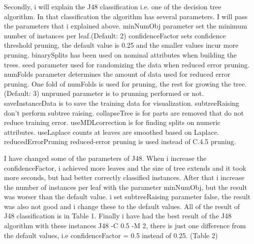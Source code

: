 \documentclass[a4paper]{article}
\begin{document}
Secondly, i will explain the J48 classification i.e. one of the decision tree algorithm. In that classification the algorithm has several parameters. I will pass the parameters that i explained above. minNumObj parameter set the minimum number of instances per leaf.(Default: 2) confidenceFactor sets confidence threshold pruning, the default value is 0.25 and the smaller values incur more pruning. binarySplits has been used on nominal attributes when building the trees. seed parameter used for randomizing the data when reduced error pruning. numFolds parameter determines the amount of data used for reduced error pruning.  One fold of numFolds is used for pruning, the rest for growing the tree. (Default: 3) unpruned parameter is to prunning performed or not. saveInstanceData is to save the training data for visualization. subtreeRaising don't perform subtree raising. collapseTree is for parts are removed that do not reduce training error. useMDLcorrection is for finding splits on numeric attributes. useLaplace counts at leaves are smoothed based on Laplace. reducedErrorPruning reduced-error pruning is used instead of C.4.5 pruning. 

I have changed some of the parameters of J48. When i increase the confidenceFactor, i achieved more leaves and the size of tree extends and it took more seconds, but had better correctly classified instances. After that i increase the number of instances per leaf with the parameter minNumObj, but the result was worser than the default value. i set subtreeRaising parameter false, the result was also not good and i change these to the default values. All of the result of J48 classification is in Table 1. Finally i have had the best result of the J48 algorithm with these instances J48 -C 0.5 -M 2, there is just one difference from the default values, i.e confidenceFactor = 0.5 instead of 0.25. (Table 2) 
\end{document}
